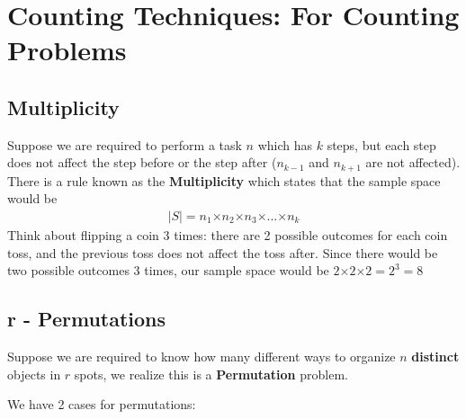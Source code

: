 \documentclass[12pt, titlepage, oneside]{article}
\newcommand{\cross}{\bm{\times}}
\renewcommand{\b}[1]{\textbf{#1}}
\begin{document}
\setcounter{section}{1}
\setcounter{page}{3}

\section{Counting Techniques: For Counting Problems}

\subsection{Multiplicity}

Suppose we are required to perform a task $n$ which has $k$ steps, but each step does not affect the step before or the step after ($n_{k-1}$ and $n_{k+1}$ are not affected). There is a rule known as the \b{Multiplicity} which states that the sample space would be
\begin{align}
|S| = n_1 \cross n_2 \cross n_3 \cross ... \cross n_k
\end{align}
Think about flipping a coin 3 times: there are 2 possible outcomes for each coin toss, and the previous toss does not affect the toss after. Since there would be two possible outcomes $3$ times, our sample space would be $2 \cross 2 \cross 2 = 2^3 = 8$

\subsection{r - Permutations}

Suppose we are required to know how many different ways to organize $n$ \b{distinct} objects in $r$ spots, we realize this is a \b{Permutation} problem.

We have 2 cases for permutations:
\end{document}
